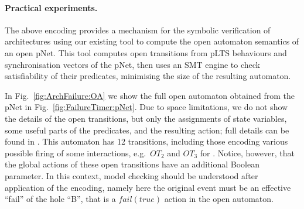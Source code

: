 \documentclass{llncs}
\newcommand{\Simon}{\\\hfill\mdash Simon}
\newcommand{\noteSB}[2][color=green!40, size=\tiny]{\todo[#1]{{#2}\Simon}}
\newcommand{\todoEM}[2][color=blue!40, size=\tiny]{\todo[#1]{\textbf{To-do Eric:} {#2}}}
\newcommand{\newCoord}[1]{{\color{blue}#1}}
\newcommand{\fig}[1]{Fig.~\ref{fig:#1}}
\newcommand{\ex}[1]{Ex.~\ref{ex:#1}}
\newcommand{\mdash}[1][]{---#1}
\newcommand{\eg}[1][\ ]{e.g.#1}
\begin{document}
\paragraph{Practical experiments.}
The above encoding provides a mechanism for the symbolic verification
of architectures using our existing tool
\cite{HMZ-FORTE2016QBMZ-AVOCS18} to compute the open automaton
semantics of an open pNet. This tool computes open transitions from
pLTS behaviours and synchronisation vectors of the pNet, then uses an
SMT engine to check satisfiability of their predicates, minimising the
size of the resulting automaton.

In \fig{ArchFailure:OA} we show the full open automaton
obtained from the pNet in \fig{FailureTimer:pNet}.  Due to space limitations, we do not show the
details of the open transitions, but only the assignments of state
variables, some useful parts of the predicates, and the resulting
action; full details can be found in 
\cite{arch-pNets-RR}.
%
This automaton has 12 transitions, including those encoding various
possible firing of some interactions, \eg $OT_2$ and $OT_3$ for
{\PortFail}.  \newCoord{Notice, however, that the global actions of these open transitions have an additional Boolean parameter.  In this context, model checking should be understood after application of the encoding, namely here the original {\PortFail} event must be an effective ``fail'' of the hole ``B'', that is a $\mathit{fail}(\mathit{true})$ action in the open automaton.}
\end{document}
